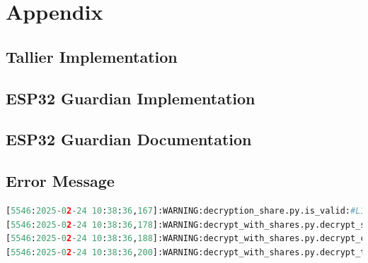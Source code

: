 \chapter{Appendix}
\section{Tallier Implementation}
\section{ESP32 Guardian Implementation}
\section{ESP32 Guardian Documentation}

\section{Error Message}
\begin{lstlisting}[language=Python, label={lst:proof}, breaklines=true, breakatwhitespace=false, linewidth=\textwidth, caption={Tallier receives Decryption with invalid Chaum-Pedersen proof}]
[5546:2025-02-24 10:38:36,167]:WARNING:decryption_share.py.is_valid:#L129: CiphertextDecryptionSelection is_valid failed for guardian: 083af2b6253c selection: yes-selection with invalid proof
[5546:2025-02-24 10:38:36,178]:WARNING:decrypt_with_shares.py.decrypt_selection_with_decryption_shares:#L182: share: yes-selection has invalid proof or recovered parts
[5546:2025-02-24 10:38:36,188]:WARNING:decrypt_with_shares.py.decrypt_contest_with_decryption_shares:#L146: could not decrypt contest referendum-single-vote with selection yes-selection
[5546:2025-02-24 10:38:36,200]:WARNING:decrypt_with_shares.py.decrypt_tally:#L66: contest: referendum-single-vote failed to decrypt with shares
\end{lstlisting}
